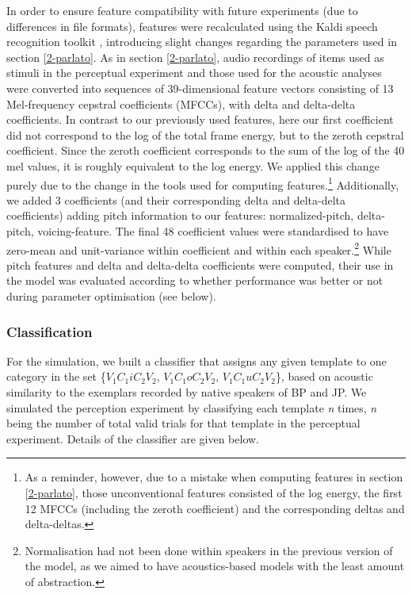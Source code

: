 In order to ensure feature compatibility with future experiments (due to differences in file formats), features were recalculated using the Kaldi speech recognition toolkit \cite{povey2011}, introducing slight changes regarding the parameters used in section \ref{2-parlato}. As in section \ref{2-parlato}, audio recordings of items used as stimuli in the perceptual experiment and those used for the acoustic analyses were converted into sequences of 39-dimensional feature vectors consisting of 13 Mel-frequency cepstral coefficients (MFCCs), with delta and delta-delta coefficients. In contrast to our previously used features, here our first coefficient did not correspond to the log of the total frame energy, but to the zeroth cepstral coefficient. Since the zeroth coefficient corresponds to the sum of the log of the 40 mel values, it is roughly equivalent to the log energy. We applied this change purely due to the change in the tools used for computing features.\footnote{As a reminder, however, due to a mistake when computing features in section \ref{2-parlato}, those unconventional features consisted of the log energy, the first 12 MFCCs (including the zeroth coefficient) and the corresponding deltas and delta-deltas.}
Additionally, we added 3 coefficients (and their corresponding delta and delta-delta coefficients) adding pitch information to our features: normalized-pitch, delta-pitch, voicing-feature. The final 48 coefficient values were standardised to have zero-mean and unit-variance within coefficient and within each speaker.\footnote{Normalisation had not been done within speakers in the previous version of the model, as we aimed to have acoustics-based models with the least amount of abstraction.} While pitch features and delta and delta-delta coefficients were computed, their use in the model was evaluated according to whether performance was better or not during parameter optimisation (see below).   

\subsubsection{Classification}
For the simulation, we built a classifier that assigns any given template to one category in the set \{$V_{1}C_{1}iC_{2}V_{2}$, $V_{1}C_{1}oC_{2}V_{2}$, $V_{1}C_{1}uC_{2}V_{2}$\}, based on acoustic similarity to the exemplars recorded by native speakers of BP and JP. We simulated the perception experiment by classifying each template \textit{n} times, \textit{n} being the number of total valid trials for that template in the perceptual experiment. Details of the classifier are given below. 

